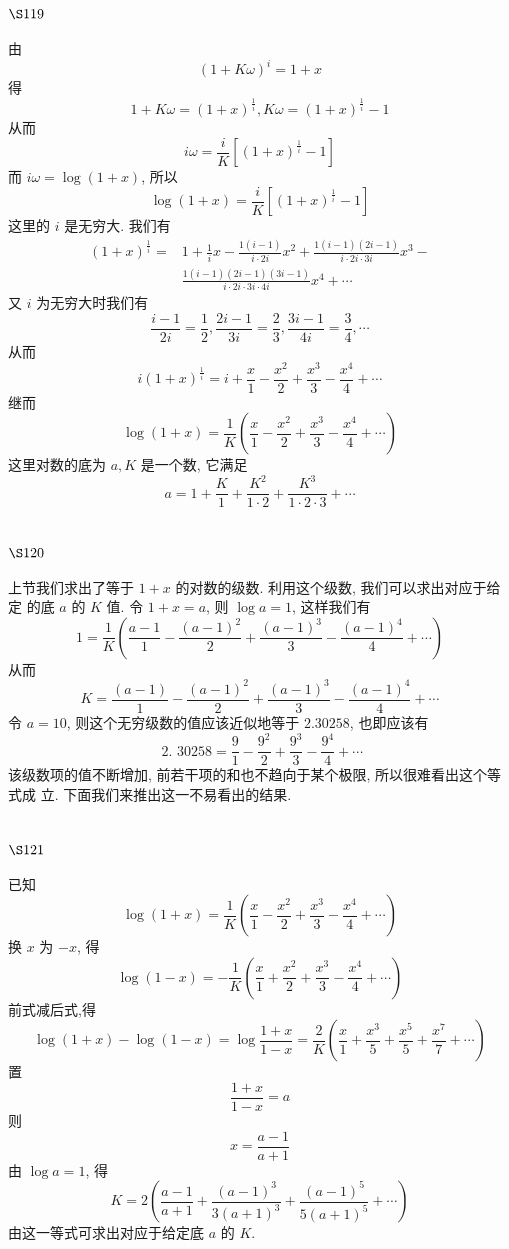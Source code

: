 \section{$\S 119$}

由
\[
(1+K \omega)^{i}=1+x
\]
得
\[
1+K \omega=(1+x)^{\frac{1}{i}}, K \omega=(1+x)^{\frac{1}{i}}-1
\]
从而
\[
i \omega=\frac{i}{K}\left[(1+x)^{\frac{1}{i}}-1\right]
\]
而 $i \omega=\log (1+x)$, 所以
\[
\log (1+x)=\frac{i}{K}\left[(1+x)^{\frac{1}{i}}-1\right]
\]
这里的 $i$ 是无穷大. 我们有
\[
\begin{aligned}
(1+x)^{\frac{1}{i}}= & 1+\frac{1}{i} x-\frac{1(i-1)}{i \cdot 2 i} x^{2}+\frac{1(i-1)(2 i-1)}{i \cdot 2 i \cdot 3 i} x^{3}- \\
& \frac{1(i-1)(2 i-1)(3 i-1)}{i \cdot 2 i \cdot 3 i \cdot 4 i} x^{4}+\cdots
\end{aligned}
\]
又 $i$ 为无穷大时我们有
\[
\frac{i-1}{2 i}=\frac{1}{2}, \frac{2 i-1}{3 i}=\frac{2}{3}, \frac{3 i-1}{4 i}=\frac{3}{4}, \cdots
\]
从而
\[
i(1+x)^{\frac{1}{i}}=i+\frac{x}{1}-\frac{x^{2}}{2}+\frac{x^{3}}{3}-\frac{x^{4}}{4}+\cdots
\]
继而
\[
\log (1+x)=\frac{1}{K}\left(\frac{x}{1}-\frac{x^{2}}{2}+\frac{x^{3}}{3}-\frac{x^{4}}{4}+\cdots\right)
\]
这里对数的底为 $a, K$ 是一个数, 它满足
\[
a=1+\frac{K}{1}+\frac{K^{2}}{1 \cdot 2}+\frac{K^{3}}{1 \cdot 2 \cdot 3}+\cdots
\]
\section{$\S 120$}

上节我们求出了等于 $1+x$ 的对数的级数. 利用这个级数, 我们可以求出对应于给定 的底 $a$ 的 $K$ 值. 令 $1+x=a$, 则 $\log a=1$, 这样我们有
\[
1=\frac{1}{K}\left(\frac{a-1}{1}-\frac{(a-1)^{2}}{2}+\frac{(a-1)^{3}}{3}-\frac{(a-1)^{4}}{4}+\cdots\right)
\]
从而
\[
K=\frac{(a-1)}{1}-\frac{(a-1)^{2}}{2}+\frac{(a-1)^{3}}{3}-\frac{(a-1)^{4}}{4}+\cdots
\]
令 $a=10$, 则这个无穷级数的值应该近似地等于 $2.30258$, 也即应该有
\[
\text { 2. } 30258=\frac{9}{1}-\frac{9^{2}}{2}+\frac{9^{3}}{3}-\frac{9^{4}}{4}+\cdots
\]
该级数项的值不断增加, 前若干项的和也不趋向于某个极限, 所以很难看出这个等式成 立. 下面我们来推出这一不易看出的结果.

\section{$\S 121$}

已知
\[
\log (1+x)=\frac{1}{K}\left(\frac{x}{1}-\frac{x^{2}}{2}+\frac{x^{3}}{3}-\frac{x^{4}}{4}+\cdots\right)
\]
换 $x$ 为 $-x$, 得
\[
\log (1-x)=-\frac{1}{K}\left(\frac{x}{1}+\frac{x^{2}}{2}+\frac{x^{3}}{3}-\frac{x^{4}}{4}+\cdots\right)
\]
前式减后式,得
\[
\log (1+x)-\log (1-x)=\log \frac{1+x}{1-x}=\frac{2}{K}\left(\frac{x}{1}+\frac{x^{3}}{5}+\frac{x^{5}}{5}+\frac{x^{7}}{7}+\cdots\right)
\]
置
\[
\frac{1+x}{1-x}=a
\]
则
\[
x=\frac{a-1}{a+1}
\]
由 $\log a=1$, 得
\[
K=2\left(\frac{a-1}{a+1}+\frac{(a-1)^{3}}{3(a+1)^{3}}+\frac{(a-1)^{5}}{5(a+1)^{5}}+\cdots\right)
\]
由这一等式可求出对应于给定底 $a$ 的 $K$.

